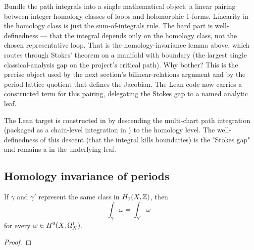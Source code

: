 \begin{layman}
Bundle the path integrals into a single mathematical object: a
linear pairing between integer homology classes of loops and
holomorphic 1-forms. Linearity in the homology class is just the
sum-of-integrals rule. The hard part is well-definedness --- that
the integral depends only on the homology class, not the chosen
representative loop. That is the homology-invariance lemma above,
which routes through Stokes' theorem on a manifold with boundary
(the largest single classical-analysis gap on the project's
critical path). Why bother? This is the precise object used by
the next section's bilinear-relations argument and by the
period-lattice quotient that defines the Jacobian. The Lean code now
carries a constructed term for this pairing, delegating the Stokes
gap to a named analytic leaf.
\end{layman}

\begin{proofsketch}
The Lean target  is
constructed in
 by descending the
multi-chart path integration  (packaged
as a chain-level integration in
) to the
homology level. The well-definedness of this descent (that the
integral kills boundaries) is the "Stokes gap" and remains a
 in the underlying 
leaf.
\end{proofsketch}

\subsection{Homology invariance of periods}

\begin{lemma}
\label{lem:period-homology-invariance}
If \(\gamma\) and \(\gamma'\) represent the same class in \(H_1(X,\mathbb{Z})\), then
\[
  \int_{\gamma}\omega=\int_{\gamma'}\omega
\]
for every \(\omega\in H^{0}(X,\Omega^{1}_{X})\).
\leanok
\end{lemma}
\begin{proof}\leanok\end{proof}

